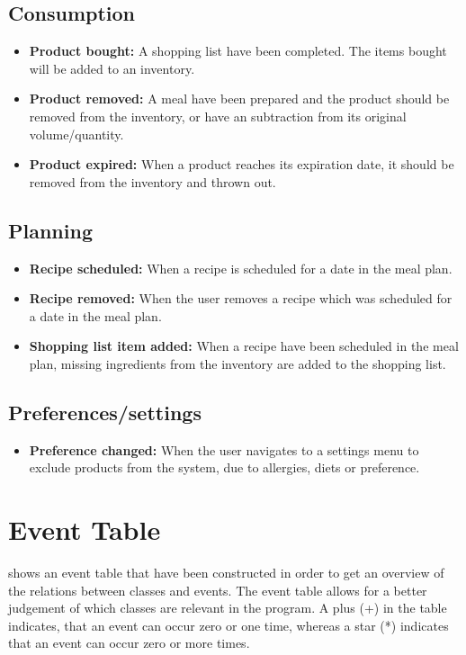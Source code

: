 \subsection{Consumption}
\begin{itemize}
\item \textbf{Product bought:} A shopping list have been completed. The items bought will be added to an inventory.
\item \textbf{Product removed:} A meal have been prepared and the product should be removed from the inventory, or have an subtraction from its original volume/quantity.
\item \textbf{Product expired:} When a product reaches its expiration date, it should be removed from the inventory and thrown out.
\end{itemize}

\subsection{Planning}
\begin{itemize}
    \item \textbf{Recipe scheduled:} When a recipe is scheduled for a date in the meal plan.
    \item \textbf{Recipe removed:} When the user removes a recipe which was scheduled for a date in the meal plan.
    \item \textbf{Shopping list item added:} When a recipe have been scheduled in the meal plan, missing ingredients from the inventory are added to the shopping list.
\end{itemize}

\subsection{Preferences/settings}
\begin{itemize}
\item \textbf{Preference changed:} When the user navigates to a settings menu to exclude products from the system, due to allergies, diets or preference.
\end{itemize}

\section{Event Table}
 shows an event table that have been constructed in order to get an overview of the relations between classes and events. The event table allows for a better judgement of which classes are relevant in the program. A plus (+) in the table indicates, that an event can occur zero or one time, whereas a star (*) indicates that an event can occur zero or more times.

